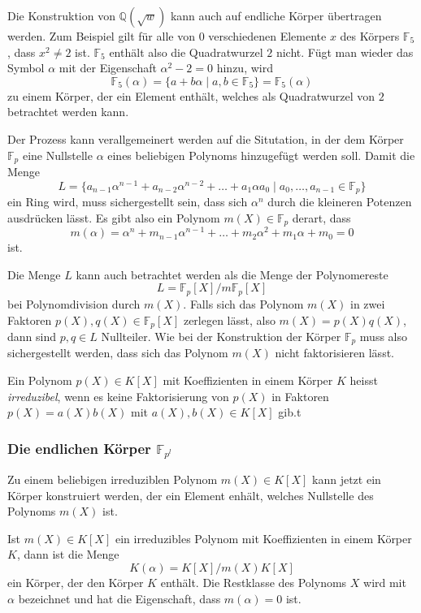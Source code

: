 Die Konstruktion von $\mathbb{Q}(\!\sqrt{w})$ kann auch auf endliche
Körper übertragen werden.
Zum Beispiel gilt für alle von $0$ verschiedenen Elemente $x$ des Körpers
$\mathbb{F}_5$, dass $x^2\ne 2$ ist.
$\mathbb{F}_5$ enthält also die Quadratwurzel $2$ nicht.
Fügt man wieder das Symbol $\alpha$ mit der Eigenschaft $\alpha^2-2=0$
hinzu, wird
\[
\mathbb{F}_5(\alpha)
=
\{
a+b\alpha
\mid
a,b\in\mathbb{F}_5
\}
=
\mathbb{F}_5(\alpha)
\]
zu einem Körper, der ein Element enthält, welches als Quadratwurzel von
$2$ betrachtet werden kann.

Der Prozess kann verallgemeinert werden auf die Situtation,
in der dem Körper $\mathbb{F}_p$ eine Nullstelle $\alpha$ eines beliebigen
Polynoms hinzugefügt werden soll.
Damit die Menge
\[
L
=
\{
a_{n-1}\alpha^{n-1} + a_{n-2}\alpha^{n-2} + \dots + a_1\alpha a_0
\mid
a_0,\dots,a_{n-1}\in\mathbb{F}_p
\}
\]
ein Ring wird, muss sichergestellt sein, dass sich $\alpha^n$ durch
die kleineren Potenzen ausdrücken lässt.
Es gibt also ein Polynom $m(X)\in\mathbb{F}_p$ derart, dass
\[
m(\alpha)
=
\alpha^n + m_{n-1}\alpha^{n-1} + \dots + m_2\alpha^2 + m_1\alpha + m_0
=
0
\]
ist.

Die Menge $L$ kann auch betrachtet werden als die Menge der Polynomereste
\[
L
=
\mathbb{F}_p[X] / m\mathbb{F}_p[X]
\]
bei Polynomdivision durch $m(X)$.
Falls sich das Polynom $m(X)$ in zwei Faktoren $p(X),q(X)\in\mathbb{F}_p[X]$
zerlegen lässt, also $m(X)=p(X)q(X)$, dann sind $p,q\in L$ Nullteiler.
Wie bei der Konstruktion der Körper $\mathbb{F}_p$ muss also sichergestellt
werden, dass sich das Polynom $m(X)$ nicht faktorisieren lässt.

\begin{definition}
Ein Polynom $p(X)\in K[X]$ mit Koeffizienten in einem Körper $K$ heisst
{\em irreduzibel}, wenn es keine Faktorisierung von $p(X)$ in Faktoren
$p(X)=a(X)b(X)$ mit $a(X),b(X)\in K[X]$ gib.t
\end{definition}

%
%
\subsubsection{Die endlichen Körper $\mathbb{F}_{p^l}$}
Zu einem beliebigen irreduziblen Polynom $m(X)\in K[X]$ kann jetzt
ein Körper konstruiert werden, der ein Element enhält, welches Nullstelle
des Polynoms $m(X)$ ist.

\begin{satz}
Ist $m(X)\in K[X]$ ein irreduzibles Polynom mit Koeffizienten in einem
Körper $K$, dann ist die Menge
\[
K(\alpha)
=
K[X] / m(X) K[X]
\]
ein Körper, der den Körper $K$ enthält.
Die Restklasse des Polynoms $X$ wird mit $\alpha$ bezeichnet und hat
die Eigenschaft, dass $m(\alpha)=0$ ist.
\end{satz}


